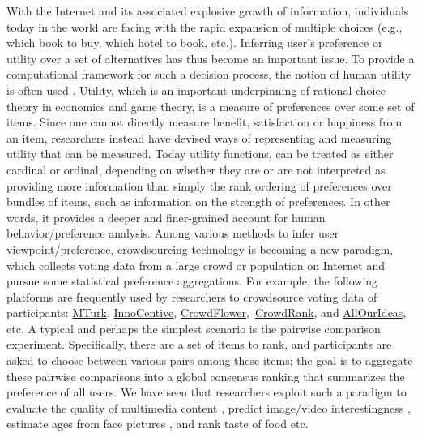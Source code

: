 \documentclass[10pt,journal,cspaper,compsoc]{IEEEtran}
\begin{document}
With the Internet and its associated explosive growth of information, individuals today in the world are facing with the
rapid expansion of multiple choices (e.g., which book to buy, which hotel to book, etc.). Inferring user's preference or utility over a set of alternatives has thus become an important
issue. To provide a computational framework for such a decision process, the notion of human utility is often used \cite{neumann1944theory}. Utility, which is an important underpinning of rational choice theory in economics and game theory, is a measure of preferences over some set of items. Since one cannot directly measure benefit, satisfaction or happiness from an item, researchers instead have devised ways of representing and measuring utility that can be measured. Today utility functions, can be treated as either cardinal or ordinal, depending on whether they are or are not interpreted as providing more information than simply the rank ordering of preferences over bundles of items, such as information on the strength of preferences. In other words, it provides a
deeper and finer-grained account for human behavior/preference analysis.
Among various methods to infer user viewpoint/preference, crowdsourcing technology is becoming a new paradigm, which collects voting data from a large crowd or population on Internet and pursue some statistical preference aggregations. For example, the following platforms are frequently used by researchers to crowdsource voting data of participants: \href{https://www.mturk.com}{MTurk}, \href{http://www.innocentive.com/}{InnoCentive}, \href{http://crowdflower.com/}{CrowdFlower},~\href{http://www.crowdrank.net/}{CrowdRank}, and \href{http://www.allourideas.org/}{AllOurIdeas}, etc. A typical and perhaps the simplest scenario is the pairwise comparison experiment. Specifically,
there are a set of items to rank, and participants are asked to choose between various pairs among these items; the goal is to aggregate these pairwise comparisons
into a global consensus ranking that summarizes the preference of all users. We have seen that researchers exploit such a paradigm to evaluate the quality of multimedia content \cite{MM09}, predict image/video interestingness \cite{fu2014interestingness}, estimate ages from face pictures \cite{fu2015robust}, and rank taste of food \cite{jamieson2011active} etc.
\end{document}
